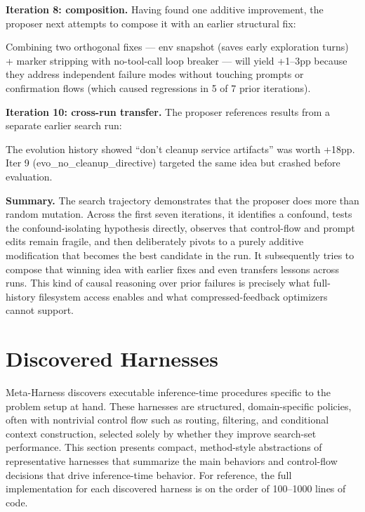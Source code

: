 \textbf{Iteration 8: composition.}
Having found one additive improvement, the proposer next attempts to compose it with an earlier structural fix:

\begin{logbox}
Combining two orthogonal fixes --- env snapshot (saves early exploration turns) + marker stripping with no-tool-call loop breaker --- will yield +1--3pp because they address independent failure modes without touching prompts or confirmation flows (which caused regressions in 5 of 7 prior iterations).
\end{logbox}

\textbf{Iteration 10: cross-run transfer.}
The proposer references results from a separate earlier search run:

\begin{logbox}
The evolution history showed ``don't cleanup service artifacts'' was worth +18pp. Iter 9 (evo\_no\_cleanup\_directive) targeted the same idea but crashed before evaluation.
\end{logbox}

\textbf{Summary.}
The search trajectory demonstrates that the proposer does more than random mutation.
Across the first seven iterations, it identifies a confound, tests the confound-isolating hypothesis directly, observes that control-flow and prompt edits remain fragile, and then deliberately pivots to a purely additive modification that becomes the best candidate in the run.
It subsequently tries to compose that winning idea with earlier fixes and even transfers lessons across runs.
This kind of causal reasoning over prior failures is precisely what full-history filesystem access enables and what compressed-feedback optimizers cannot support.


\section{Discovered Harnesses}
\label{app:discovered-harnesses}

Meta-Harness discovers executable inference-time procedures specific to the problem setup at hand.
These harnesses are structured, domain-specific policies, often with nontrivial control flow such as routing, filtering, and conditional context construction, selected solely by whether they improve search-set performance.
This section presents compact, method-style abstractions of representative harnesses that summarize the main behaviors and control-flow decisions that drive inference-time behavior.
For reference, the full implementation for each discovered harness is on the order of 100--1000 lines of code.

